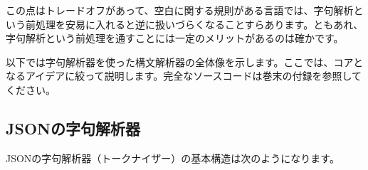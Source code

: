 この点はトレードオフがあって、空白に関する規則がある言語では、字句解析という前処理を安易に入れると逆に扱いづらくなることすらあります。ともあれ、字句解析という前処理を通すことには一定のメリットがあるのは確かです。

以下では字句解析器を使った構文解析器の全体像を示します。ここでは、コアとなるアイデアに絞って説明します。完全なソースコードは巻末の付録を参照してください。

\hypertarget{chapter3-jsonux306eux5b57ux53e5ux89e3ux6790ux5668}{%
\subsection{JSONの字句解析器}\label{chapter3-jsonux306eux5b57ux53e5ux89e3ux6790ux5668}}

JSONの字句解析器（トークナイザー）の基本構造は次のようになります。

